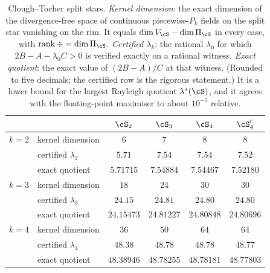 \begin{table}[ht]
\centering
\begin{tabular}{llcccc}
\toprule
 & & $\cS_2$ & $\cS_3$ & $\cS_4$ & $\cS_4'$\\
\midrule
$k=2$ & kernel dimension & $6$ & $7$ & $8$ & $8$\\
 & certified $\lambda_2$ & $5.71$ & $7.54$ & $7.54$ & $7.52$\\
 & exact quotient & $5.71715$ & $7.54884$ & $7.54467$ & $7.52180$\\
\midrule
$k=3$ & kernel dimension & $18$ & $24$ & $30$ & $30$\\
 & certified $\lambda_3$ & $24.15$ & $24.81$ & $24.80$ & $24.80$\\
 & exact quotient & $24.15473$ & $24.81227$ & $24.80848$ & $24.80696$\\
\midrule
$k=4$ & kernel dimension & $36$ & $50$ & $64$ & $64$\\
 & certified $\lambda_4$ & $48.38$ & $48.78$ & $48.78$ & $48.77$\\
 & exact quotient & $48.38946$ & $48.78255$ & $48.78181$ & $48.77803$\\
\bottomrule
\end{tabular}
\caption{Clough--Tocher split stars. \emph{Kernel dimension}: the exact dimension of the divergence-free space of continuous piecewise-$P_k$ fields on the split star vanishing on the rim. It equals $\dim V_\cS-\dim\Pi_\cS$ in every case, with $\operatorname{rank}\div=\dim\Pi_\cS$. \emph{Certified $\lambda_k$}: the rational $\lambda_0$ for which $2B-A-\lambda_0C>0$ is verified exactly on a rational witness. \emph{Exact quotient}: the exact value of $(2B-A)/C$ at that witness. (Rounded to five decimals; the certified row is the rigorous statement.) It is a lower bound for the largest Rayleigh quotient $\lambda^\ast(\cS)$, and it agrees with the floating-point maximiser to about $10^{-5}$ relative.}
\label{ct:tab:lam}
\end{table}

